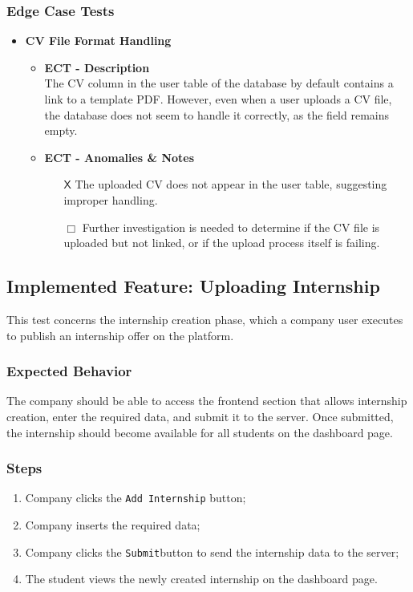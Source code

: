 \subsubsection{Edge Case Tests}
\begin{itemize} [label= {\color{titleColor}\(\diamond\)}]
    \item \textbf{\color{titleColor} CV File Format Handling}
    \begin{itemize}
        \item \textbf{\color{titleColor} ECT - Description}\\ 
        The CV column in the user table of the database by default contains a link to a template PDF. However, even when a user uploads a CV file, the database does not seem to handle it correctly, as the field remains empty.
        \item \textbf{\color{titleColor} ECT - Anomalies \& Notes}\\
        \begin{itemize}
            \item [{\color{titleColor}\(\mathsf{X}\)}] The uploaded CV does not appear in the user table, suggesting improper handling.
            \item [{\color{titleColor}\(\Box \)}] Further investigation is needed to determine if the CV file is uploaded but not linked, or if the upload process itself is failing.
        \end{itemize} 
    \end{itemize}
\end{itemize}


\subsection{Implemented Feature:  Uploading Internship}
This test concerns the internship creation phase, which a company user executes to publish an internship offer on the platform.
\subsubsection{Expected Behavior}
The company should be able to access the frontend section that allows internship creation, enter the required data, and submit it to the server. Once submitted, the internship should become available for all students on the dashboard page.
\subsubsection{Steps}
\begin{enumerate}
    \item Company clicks the \verb|Add Internship| button;
    \item Company inserts the required  data;
    \item Company clicks the \verb|Submit|button to send the internship data to the server;
    \item The student views the newly created internship on the dashboard page.
\end{enumerate}

